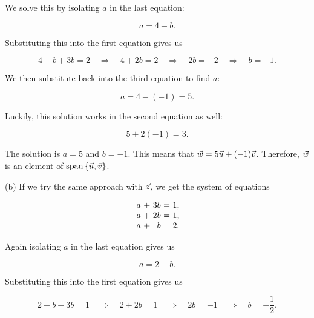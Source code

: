 \documentclass{ximera}
\begin{document}
\begin{exploration}
\begin{example}
\begin{solution}
    We solve this by isolating $a$ in the last equation: 

    \begin{equation*}
      a = 4 - b.
    \end{equation*}

    Substituting this into the first equation gives us

    \begin{equation*}
      4 - b + 3b = 2 \quad \Rightarrow \quad 4 + 2b = 2 \quad \Rightarrow \quad 2b = -2 \quad \Rightarrow \quad b = -1.
    \end{equation*}

    We then substitute back into the third equation to find $a$:

    \begin{equation*}
      a = 4 - (-1) = 5.
    \end{equation*}

    Luckily, this solution works in the second equation as well:

    \begin{equation*}
      5 + 2(-1) = 3.
    \end{equation*}
  
    The solution is $a=5$ and $b=-1$. This means that
    $\vec{w} = 5\vec{u} + (-1)\vec{v}$. Therefore, $\vec{w}$ is an
    element of $\text{span}\left\{\vec{u},\vec{v}\right\}$.
  
    (b) If we try the same approach with $\vec{z}$, we get the system of equations
  
    \begin{equation*}
      \begin{array}{r@{~}c@{~}r@{~}c@{~}r@{~}r}
        a & + & 3b & = & 1, \\
        a & + & 2b & = & 1, \\
        a & + & b & = & 2.
      \end{array}
    \end{equation*}

    Again isolating $a$ in the last equation gives us

    \begin{equation*}
      a = 2 - b.
    \end{equation*}

    Substituting this into the first equation gives us

    \begin{equation*}
      2 - b + 3b = 1 \quad \Rightarrow \quad 2 + 2b = 1 \quad \Rightarrow \quad 2b = -1 \quad \Rightarrow \quad b = -\frac{1}{2}.
    \end{equation*}


\end{solution}
\end{example}
\end{exploration}
\end{document}
